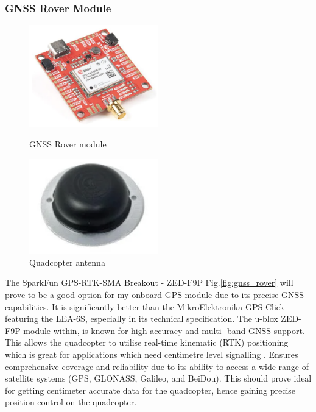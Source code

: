 \documentclass{article}
\begin{document}
\subsubsection{GNSS Rover Module}
  \begin{figure}[H]
    \begin{minipage}{0.5\textwidth}
      \centering
      \includegraphics[width=0.5\textwidth]{Pictures/gnss_rover.png}
      \caption{GNSS Rover module}
      \label{fig:gnss_rover}
    \end{minipage}
    \begin{minipage}{0.5\textwidth}
      \centering
      \includegraphics[width=0.5\textwidth]{Pictures/quad_antenna.png}
      \caption{Quadcopter antenna}
      \label{fig:Quadcopter antenna}
  \end{minipage}
\end{figure}
The SparkFun GPS-RTK-SMA Breakout - ZED-F9P Fig.\ref{fig:gnss_rover} will prove to be a good option for my onboard GPS module due to its precise GNSS capabilities. It is significantly better than the MikroElektronika GPS Click featuring the LEA-6S, 
especially in its technical specification. The u-blox ZED-F9P module within, is known for high accuracy and multi- band GNSS support. This allows the quadcopter to utilise real-time kinematic (RTK) positioning which is great for applications
which need centimetre level signalling \cite{sbg_systems_2024}. Ensures comprehensive coverage and reliability due to its ability to access a wide range of satellite systems (GPS, GLONASS, Galileo, and BeiDou). This should prove ideal for getting centimeter accurate data 
for the quadcopter, hence gaining precise position control on the quadcopter.
\end{document}
